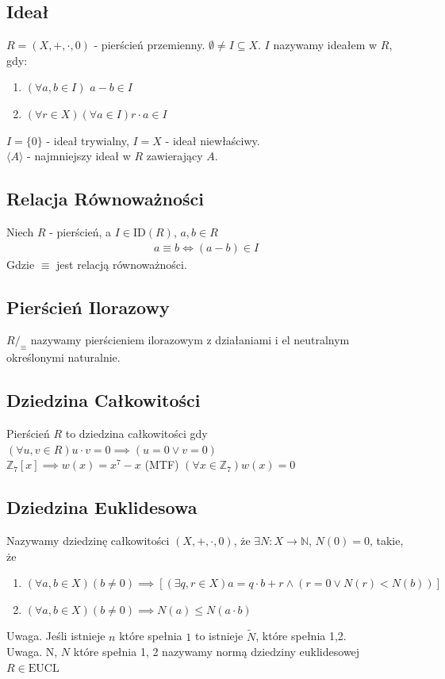 \documentclass{article}
\numberwithin{equation}{subsection}
\begin{document}
\subsection{Ideał}

$R = (X,+,\cdot, 0)$ - pierścień przemienny. $\emptyset \neq I \subseteq X$. $I$ nazywamy ideałem w $R$, gdy:
\begin{enumerate}
    \item $\left(\forall a,b\in I \right)$ $a-b \in I$
    \item $\left(\forall r \in X \right)\left(\forall a \in I\right) r\cdot a \in I$
\end{enumerate}
$I=\{0\}$ - ideał trywialny, $I=X$ - ideał niewłaściwy.\\
$\langle A\rangle$ - najmniejszy ideał w $R$ zawierający $A$.\\

\subsection{Relacja Równoważności}

Niech $R$ - pierścień, a $I \in \text{ID}(R)$, $a,b\in R$
\begin{align*}
    a \equiv b \iff (a-b) \in I
\end{align*}
Gdzie $\equiv$ jest relacją równoważności.

\subsection{Pierścień Ilorazowy}

$R/_{\equiv}$ nazywamy pierścieniem ilorazowym z działaniami i el neutralnym określonymi naturalnie.

\subsection{Dziedzina Całkowitości}

Pierścień $R$ to dziedzina całkowitości gdy $\left(\forall u,v \in R \right) u\cdot v = 0 \implies (u=0 \lor v=0)$\\
$\mathbb{Z}_7[x] \implies w(x) = x^7-x$ (MTF) $\left(\forall x \in \mathbb{Z}_7\right) w(x) = 0$

\subsection{Dziedzina Euklidesowa}

Nazywamy dziedzinę całkowitości $(X,+,\cdot, 0)$, że $\exists N : X\to \mathbb{N}$, $N(0) = 0$, takie, że 
\begin{enumerate}
    \item $\left(\forall a,b\in X\right)(b\neq 0) \implies [(\exists q,r \in X) a = q\cdot b + r \land (r=0 \lor N(r) < N(b))]$
    \item $\left(\forall a,b \in X\right)(b \neq 0) \implies N(a) \leq N(a\cdot b)$
\end{enumerate}
Uwaga. Jeśli istnieje $n$ które spełnia $1$ to istnieje $\tilde{N}$, które spełnia 1,2.\\
Uwaga. N, $N$ które spełnia 1, 2 nazywamy normą dziedziny euklidesowej $R\in \text{EUCL}$ \\
\end{document}

